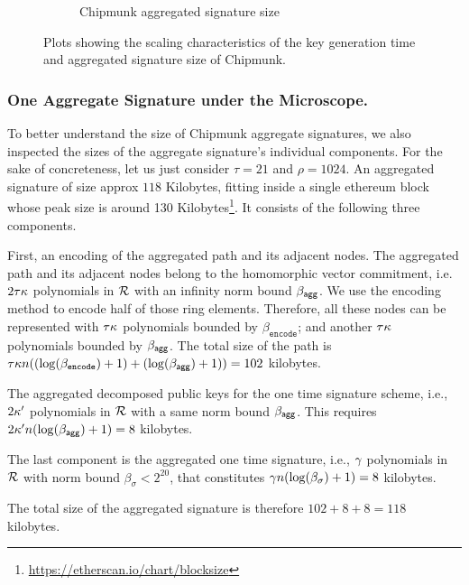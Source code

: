 \begin{figure}[H]
\begin{subfigure}[b]{0.49\textwidth}
  \caption{Chipmunk aggregated signature size}
  \label{fig:sigize}
  \end{subfigure}
  \caption{Plots showing the scaling characteristics of the key generation time and aggregated signature size of Chipmunk.} \label{fig:keygen}
\end{figure}

\subsubsection{One Aggregate Signature under the Microscope.}


To better understand the size of Chipmunk aggregate signatures, we also inspected the sizes of the aggregate signature's individual components.
For the sake of concreteness, let us just consider $\tau=21$ and $\rho=1024$.
An aggregated signature of size approx $118$ Kilobytes,
fitting inside a single ethereum block whose peak size is around 130 Kilobytes\footnote{\url{https://etherscan.io/chart/blocksize}}.
It consists of the following three components.

First, an encoding of the aggregated path and its adjacent nodes. %
The aggregated path and its adjacent nodes belong to the homomorphic vector commitment, i.e. $2\tau\kappa$ polynomials in $\mathcal{R}$ with an infinity norm bound $\beta_{\mathsf{agg}}$.
We use the encoding method to encode half of those ring elements. Therefore, all these nodes can be represented with $\tau\kappa$ polynomials bounded by $\beta_{\texttt{encode}}$; 
and another $\tau\kappa$ polynomials bounded by $\beta_{\mathsf{agg}}$. The total size of the path is $\tau\kappa n((\log(\beta_{\texttt{encode}})+1) + (\log(\beta_{\mathsf{agg}})+1)) = 102$ kilobytes.

The aggregated decomposed public keys for the one time signature scheme, i.e., $2\kappa'$ polynomials in $\mathcal{R}$ with a same norm bound $\beta_{\mathsf{agg}}$. This requires $2\kappa'n(\log(\beta_{\mathsf{agg}})+1)=8$ kilobytes.

The last component is the aggregated one time signature, i.e., $\gamma$ polynomials in $\mathcal{R}$ with norm bound $\beta_\sigma < 2^{20}$, that constitutes $\gamma n (\log(\beta_\sigma)+1)=8$ kilobytes. %

The total size of the aggregated signature is therefore $102 + 8 + 8 = 118$ kilobytes.